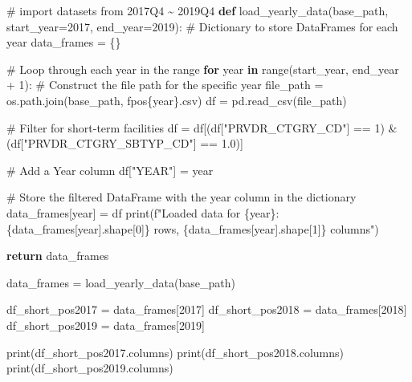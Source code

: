 \documentclass[
  letterpaper,
  DIV=11,
  numbers=noendperiod]{scrartcl}
\newenvironment{Shaded}{\begin{snugshade}}{\end{snugshade}}
\newcommand{\BuiltInTok}[1]{\textcolor[rgb]{0.00,0.23,0.31}{#1}}
\newcommand{\CommentTok}[1]{\textcolor[rgb]{0.37,0.37,0.37}{#1}}
\newcommand{\ControlFlowTok}[1]{\textcolor[rgb]{0.00,0.23,0.31}{\textbf{#1}}}
\newcommand{\DecValTok}[1]{\textcolor[rgb]{0.68,0.00,0.00}{#1}}
\newcommand{\FloatTok}[1]{\textcolor[rgb]{0.68,0.00,0.00}{#1}}
\newcommand{\KeywordTok}[1]{\textcolor[rgb]{0.00,0.23,0.31}{\textbf{#1}}}
\newcommand{\NormalTok}[1]{\textcolor[rgb]{0.00,0.23,0.31}{#1}}
\newcommand{\OperatorTok}[1]{\textcolor[rgb]{0.37,0.37,0.37}{#1}}
\newcommand{\SpecialCharTok}[1]{\textcolor[rgb]{0.37,0.37,0.37}{#1}}
\newcommand{\SpecialStringTok}[1]{\textcolor[rgb]{0.13,0.47,0.30}{#1}}
\newcommand{\StringTok}[1]{\textcolor[rgb]{0.13,0.47,0.30}{#1}}
\begin{document}
\begin{Shaded}
\begin{Highlighting}[]
\CommentTok{\# import datasets from 2017Q4 \textasciitilde{} 2019Q4}
\KeywordTok{def}\NormalTok{ load\_yearly\_data(base\_path, start\_year}\OperatorTok{=}\DecValTok{2017}\NormalTok{, end\_year}\OperatorTok{=}\DecValTok{2019}\NormalTok{):}
    \CommentTok{\# Dictionary to store DataFrames for each year}
\NormalTok{    data\_frames }\OperatorTok{=}\NormalTok{ \{\}}
    
    \CommentTok{\# Loop through each year in the range}
    \ControlFlowTok{for}\NormalTok{ year }\KeywordTok{in} \BuiltInTok{range}\NormalTok{(start\_year, end\_year }\OperatorTok{+} \DecValTok{1}\NormalTok{):}
        \CommentTok{\# Construct the file path for the specific year}
\NormalTok{        file\_path }\OperatorTok{=}\NormalTok{ os.path.join(base\_path, }\SpecialStringTok{f\textquotesingle{}pos}\SpecialCharTok{\{}\NormalTok{year}\SpecialCharTok{\}}\SpecialStringTok{.csv\textquotesingle{}}\NormalTok{)}
\NormalTok{        df }\OperatorTok{=}\NormalTok{ pd.read\_csv(file\_path)}
        
        \CommentTok{\# Filter for short{-}term facilities}
\NormalTok{        df }\OperatorTok{=}\NormalTok{ df[(df[}\StringTok{"PRVDR\_CTGRY\_CD"}\NormalTok{] }\OperatorTok{==} \DecValTok{1}\NormalTok{) }\OperatorTok{\&}\NormalTok{ (df[}\StringTok{"PRVDR\_CTGRY\_SBTYP\_CD"}\NormalTok{] }\OperatorTok{==} \FloatTok{1.0}\NormalTok{)]}
        
        \CommentTok{\# Add a \textquotesingle{}Year\textquotesingle{} column}
\NormalTok{        df[}\StringTok{"YEAR"}\NormalTok{] }\OperatorTok{=}\NormalTok{ year}
        
        \CommentTok{\# Store the filtered DataFrame with the year column in the dictionary}
\NormalTok{        data\_frames[year] }\OperatorTok{=}\NormalTok{ df        }
        \BuiltInTok{print}\NormalTok{(}\SpecialStringTok{f"Loaded data for }\SpecialCharTok{\{}\NormalTok{year}\SpecialCharTok{\}}\SpecialStringTok{: }\SpecialCharTok{\{}\NormalTok{data\_frames[year]}\SpecialCharTok{.}\NormalTok{shape[}\DecValTok{0}\NormalTok{]}\SpecialCharTok{\}}\SpecialStringTok{ rows, }\SpecialCharTok{\{}\NormalTok{data\_frames[year]}\SpecialCharTok{.}\NormalTok{shape[}\DecValTok{1}\NormalTok{]}\SpecialCharTok{\}}\SpecialStringTok{ columns"}\NormalTok{)}
    
    \ControlFlowTok{return}\NormalTok{ data\_frames}

\NormalTok{data\_frames }\OperatorTok{=}\NormalTok{ load\_yearly\_data(base\_path)}

\NormalTok{df\_short\_pos2017 }\OperatorTok{=}\NormalTok{ data\_frames[}\DecValTok{2017}\NormalTok{]}
\NormalTok{df\_short\_pos2018 }\OperatorTok{=}\NormalTok{ data\_frames[}\DecValTok{2018}\NormalTok{]}
\NormalTok{df\_short\_pos2019 }\OperatorTok{=}\NormalTok{ data\_frames[}\DecValTok{2019}\NormalTok{]}

\BuiltInTok{print}\NormalTok{(df\_short\_pos2017.columns)}
\BuiltInTok{print}\NormalTok{(df\_short\_pos2018.columns)}
\BuiltInTok{print}\NormalTok{(df\_short\_pos2019.columns)}
\end{Highlighting}
\end{Shaded}
\end{document}

